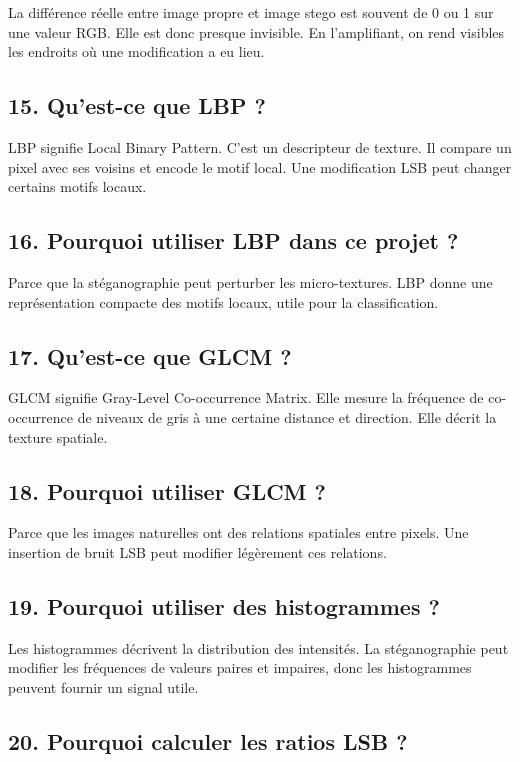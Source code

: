 \documentclass[11pt,a4paper]{article}
\begin{document}
La différence réelle entre image propre et image stego est souvent de 0 ou 1 sur une valeur RGB. Elle est donc presque invisible. En l'amplifiant, on rend visibles les endroits où une modification a eu lieu.

\subsection{15. Qu'est-ce que LBP ?}

LBP signifie Local Binary Pattern. C'est un descripteur de texture. Il compare un pixel avec ses voisins et encode le motif local. Une modification LSB peut changer certains motifs locaux.

\subsection{16. Pourquoi utiliser LBP dans ce projet ?}

Parce que la stéganographie peut perturber les micro-textures. LBP donne une représentation compacte des motifs locaux, utile pour la classification.

\subsection{17. Qu'est-ce que GLCM ?}

GLCM signifie Gray-Level Co-occurrence Matrix. Elle mesure la fréquence de co-occurrence de niveaux de gris à une certaine distance et direction. Elle décrit la texture spatiale.

\subsection{18. Pourquoi utiliser GLCM ?}

Parce que les images naturelles ont des relations spatiales entre pixels. Une insertion de bruit LSB peut modifier légèrement ces relations.

\subsection{19. Pourquoi utiliser des histogrammes ?}

Les histogrammes décrivent la distribution des intensités. La stéganographie peut modifier les fréquences de valeurs paires et impaires, donc les histogrammes peuvent fournir un signal utile.

\subsection{20. Pourquoi calculer les ratios LSB ?}
\end{document}
